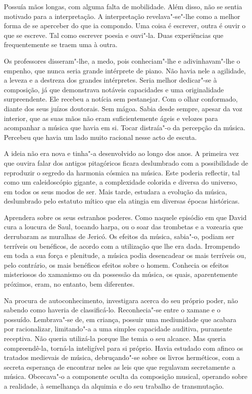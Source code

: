 Possuía mãos longas, com alguma falta de mobilidade. Além disso, não se
sentia motivado para a interpretação. A interpretação revelava"-se"-lhe
como a melhor forma de se aperceber do que ia compondo. Uma coisa é
escrever, outra é ouvir o que se escreve. Tal como escrever poesia e
ouvi"-la. Duas experiências que frequentemente se traem uma à outra.

Os professores disseram"-lhe, a medo, pois conheciam"-lhe e
adivinhavam"-lhe o empenho, que nunca seria grande intérprete de piano.
Não havia nele a agilidade, a leveza e a destreza dos grandes
intérpretes. Seria melhor dedicar"-se à composição, já que demonstrava
notáveis capacidades e uma originalidade surpreendente. Ele recebeu a
notícia sem pestanejar. Com o olhar conformado, diante dos seus juízos
doutorais. Sem mágoa. Sabia desde sempre, apesar da voz interior, que as
suas mãos não eram suficientemente ágeis e velozes para acompanhar a
música que havia em si. Tocar distraía"-o da percepção da música.
Percebeu que havia um lado muito racional nesse acto de escuta.

A ideia não era nova e tinha"-a desenvolvido ao longo dos anos. A
primeira vez que ouvira falar dos antigos pitagóricos ficara deslumbrado
com a possibilidade de reproduzir o segredo da harmonia cósmica na
música. Este poderia reflectir, tal como um caleidoscópio gigante, a
complexidade colorida e diversa do universo, em todos os seus modos de
ser. Mais tarde, estudara a evolução da música, deslumbrado pelo
estatuto mítico que ela atingia em diversas épocas históricas.

Aprendera sobre os seus estranhos poderes. Como naquele episódio em que
David cura a loucura de Saul, tocando harpa, ou o soar das trombetas e a
vozearia que derrubaram as muralhas de Jericó. Os efeitos da música,
sabia"-o, podiam ser terríveis ou benéficos, de acordo com a utilização
que lhe era dada. Irrompendo em toda a sua força e plenitude, a música
podia desencadear os mais terríveis ou, pelo contrário, os mais
benéficos efeitos sobre o homem. Conhecia os efeitos misteriosos do
xamanismo ou da possessão da música, os quais, aparentemente próximos,
eram, no entanto, bem diferentes.

Na procura de autoconhecimento, investigara acerca do seu próprio
poder, não sabendo como haveria de classificá-lo. Reconhecia"-se entre o
xamane e o possuído. Lembrava"-se de, em criança, possuir uma mediunidade
que acabara por racionalizar, limitando"-a a uma simples capacidade
auditiva, puramente receptiva. Não queria utilizá-la porque lhe temia o
seu alcance. Mas queria compreendê-la, torná-la inteligível para si
próprio. Havia estudado com afinco os tratados medievais de música,
debruçando"-se sobre os livros herméticos, com a secreta esperança de
encontrar neles as leis que que regulavam secretamente a música.
Obcecava"-o a componente oculta da composição musical, operando sobre a
realidade, à semelhança da alquimia e do seu trabalho de transmutação.

